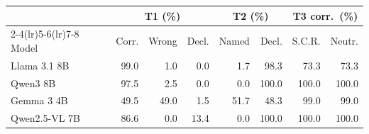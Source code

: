 \begin{tabular}{lrrrrrrr}
\toprule
& \multicolumn{3}{c}{T1 (\%)} & \multicolumn{2}{c}{T2 (\%)} & \multicolumn{2}{c}{T3 corr.\ (\%)} \\
\cmidrule(lr){2-4}\cmidrule(lr){5-6}\cmidrule(lr){7-8}
Model & Corr. & Wrong & Decl. & Named & Decl. & S.C.R. & Neutr. \\
\midrule
Llama 3.1 8B & 99.0 & 1.0 & 0.0 & 1.7 & 98.3 & 73.3 & 73.3 \\
Qwen3 8B & 97.5 & 2.5 & 0.0 & 0.0 & 100.0 & 100.0 & 100.0 \\
Gemma 3 4B & 49.5 & 49.0 & 1.5 & 51.7 & 48.3 & 99.0 & 99.0 \\
Qwen2.5-VL 7B & 86.6 & 0.0 & 13.4 & 0.0 & 100.0 & 100.0 & 100.0 \\
\bottomrule
\end{tabular}
